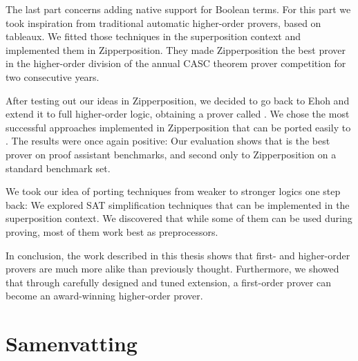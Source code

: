 The last part concerns adding native support for
Boolean terms. For this part we took inspiration from traditional
automatic higher-order provers, based on tableaux. We fitted those techniques in the
superposition context and implemented them in Zipperposition. They
made Zipperposition the best prover in the higher-order division of the annual CASC
theorem prover competition for two consecutive years.

After testing out our ideas in Zipperposition, we decided to go back to Ehoh and
extend it to full higher-order logic, obtaining a prover called \ehohii{}. We
chose the most successful approaches implemented in Zipperposition that can
be ported easily to \ehohii{}. The results were once again positive: Our
evaluation shows that \ehohii{} is the best prover on proof assistant
benchmarks, and second only to Zipperposition on a standard benchmark set.

We took our idea of porting techniques from weaker to stronger logics one step
back: We explored SAT simplification techniques that can be implemented in the
superposition context. We discovered that while some of them can be used during proving,
most of them work best as preprocessors.

In conclusion, the work described in this thesis shows that first- and
higher-order provers are much more alike than previously thought. Furthermore,
we showed that through carefully designed and tuned extension, a first-order
prover can become an award-winning higher-order prover.

\chapter*{Samenvatting}

{


}



